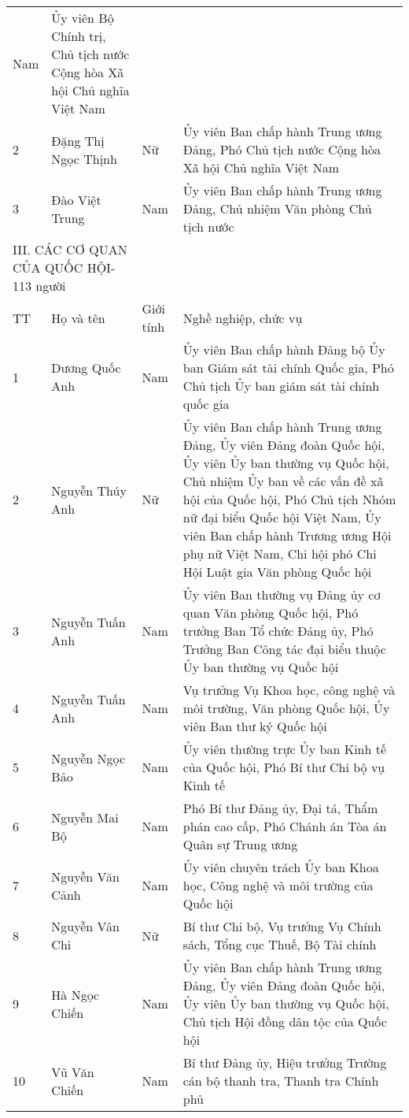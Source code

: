 \begin{longtable}{p{}p{}p{}p{}}
  Nam &
  Ủy viên Bộ Chính trị, Chủ tịch nước Cộng hòa Xã hội Chủ nghĩa Việt Nam \\
2 &
  Đặng Thị Ngọc Thịnh &
  Nữ &
  Ủy viên Ban chấp hành Trung ương Đảng, Phó Chủ tịch nước Cộng hòa Xã hội Chủ nghĩa Việt Nam \\
3 &
  Đào Việt Trung &
  Nam &
  Ủy viên Ban chấp hành Trung ương Đảng, Chủ nhiệm Văn phòng Chủ tịch nước \\
\multicolumn{2}{l}{III. CÁC CƠ QUAN CỦA QUỐC HỘI- 113 người} &
 &
 \\
TT &
  Họ và tên &
  Giới tính &
  Nghề nghiệp, chức vụ \\
1 &
  Dương Quốc Anh &
  Nam &
  Ủy viên Ban chấp hành Đảng bộ Ủy ban Giám sát tài chính Quốc gia, Phó Chủ tịch Ủy ban giám sát tài chính quốc gia \\
2 &
  Nguyễn Thúy Anh &
  Nữ &
  Ủy viên Ban chấp hành Trung ương Đảng, Ủy viên Đảng đoàn Quốc hội, Ủy viên Ủy ban thường vụ Quốc hội, Chủ nhiệm Ủy ban về các vấn đề xã hội của Quốc hội, Phó Chủ tịch Nhóm nữ đại biểu Quốc hội Việt Nam, Ủy viên Ban chấp hành Trương ương Hội phụ nữ Việt Nam, Chi hội phó Chi Hội Luật gia Văn phòng Quốc hội \\
3 &
  Nguyễn Tuấn Anh &
  Nam &
  Ủy viên Ban thường vụ Đảng ủy cơ quan Văn phòng Quốc hội, Phó trưởng Ban Tổ chức Đảng ủy, Phó Trưởng Ban Công tác đại biểu thuộc Ủy ban thường vụ Quốc hội \\
4 &
  Nguyễn Tuấn Anh &
  Nam &
  Vụ trưởng Vụ Khoa học, công nghệ và môi trường, Văn phòng Quốc hội, Ủy viên Ban thư ký Quốc hội \\
5 &
  Nguyễn Ngọc Bảo &
  Nam &
  Ủy viên thường trực Ủy ban Kinh tế của Quốc hội, Phó Bí thư Chi bộ vụ Kinh tế \\
6 &
  Nguyễn Mai Bộ &
  Nam &
  Phó Bí thư Đảng ủy, Đại tá, Thẩm phán cao cấp, Phó Chánh án Tòa án Quân sự Trung ương \\
7 &
  Nguyễn Văn Cảnh &
  Nam &
  Ủy viên chuyên trách Ủy ban Khoa học, Công nghệ và môi trường của Quốc hội \\
8 &
  Nguyễn Vân Chi &
  Nữ &
  Bí thư Chi bộ, Vụ trưởng Vụ Chính sách, Tổng cục Thuế, Bộ Tài chính \\
9 &
  Hà Ngọc Chiến &
  Nam &
  Ủy viên Ban chấp hành Trung ương Đảng, Ủy viên Đảng đoàn Quốc hội, Ủy viên Ủy ban thường vụ Quốc hội, Chủ tịch Hội đồng dân tộc của Quốc hội \\
10 &
  Vũ Văn Chiến &
  Nam &
  Bí thư Đảng ủy, Hiệu trưởng Trường cán bộ thanh tra, Thanh tra Chính phủ \\

\end{longtable}
